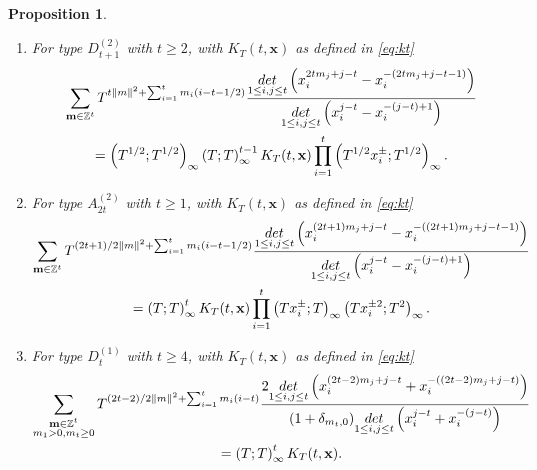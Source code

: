 \documentclass[10pt,a4paper]{amsart}
\newtheorem{prop}{Proposition}
\def\bbbz{\mathbb Z}
\def\det{{\rm det}}
\def\sgn{{\rm sgn}}
\begin{document}
\begin{prop}
\begin{enumerate}
\item For type $D^{(2)}_{t+1}$ with $t\geq 2$,  with $K_T(t,\mathbf{x})$ as defined in \eqref{eq:kt}
\begin{multline}
\sum_{\mathbf{m}\in\bbbz^t}T^{t\lVert m\rVert^2+\sum_{i=1}^tm_i(i-t-1/2)}\frac{\underset{1\le i,j\le t}{\det}\left(x_i^{2tm_j+j-t}-x_i^{-(2tm_j+j-t-1)}\right)}{\underset{1\le i,j\le t}{\det}\left(x_i^{j-t}-x_i^{-(j-t)+1}\right)}\\
=\left(T^{1/2};T^{1/2}\right)_\infty\left(T;T\right)_\infty^{t-1}
K_T(t,{\bf x})\prod_{i=1}^t \left(T^{1/2}x_i^{\pm};T^{1/2}\right)_\infty .\label{eq:misigncv}
\end{multline}

\item For type $A^{(2)}_{2t}$ with $t\geq 1$,  with $K_T(t,\mathbf{x})$ as defined in \eqref{eq:kt}
\begin{multline}
\sum_{\mathbf{m}\in\bbbz^t}T^{(2t+1)/2\lVert m\rVert^2+\sum_{i=1}^tm_i(i-t-1/2)}
\frac{\underset{1\le i,j\le t}{\det}\left(x_i^{(2t+1)m_j+j-t}-x_i^{-((2t+1)m_j+j-t-1)}\right)}{\underset{1\le i,j\le t}{\det}\left(x_i^{j-t}-x_i^{-(j-t)+1}\right)}
\\=\left(T;T\right)_\infty^{t} K_T(t,\mathbf{x})\prod_{i=1}^t\left(Tx_i^{\pm};T\right)_\infty\left(Tx_i^{\pm 2};T^2\right)_\infty.\label{eq:misignbc}
\end{multline}


\item For type $D^{(1)}_{t}$ with $t\geq 4$,  with $K_T(t,\mathbf{x})$ as defined in \eqref{eq:kt}
\begin{multline}
\sum_{\substack{\mathbf{m}\in\bbbz^{t}\\m_1>0,m_t\geq 0}}T^{(2t-2)/2\lVert m\rVert^2+\sum_{i=1}^tm_i(i-t)}
\frac{2\underset{1\le i,j\le t}{\det}\left(x_i^{(2t-2)m_j+j-t}+x_i^{-((2t-2)m_j+j-t)}\right)}{(1+\delta_{m_t,0})\underset{1\le i,j\le t}{\det}\left(x_i^{j-t}+x_i^{-(j-t)}\right)}
\\=\left(T;T\right)_\infty^{t} K_T(t,\mathbf{x}).\label{eq:misignd}
\end{multline}

\end{enumerate}

\end{prop}
\end{document}
